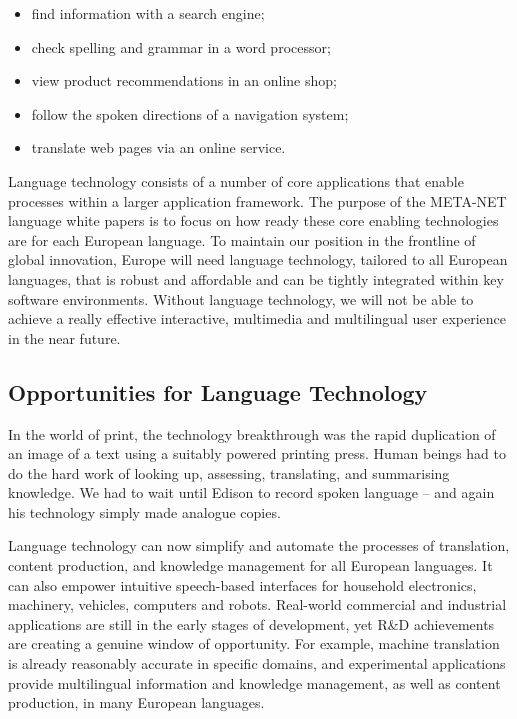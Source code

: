 \documentclass{../../metanetpaper}
\begin{document}
\begin{multicols}{2}
\begin{itemize}
\item find information with a search engine;
\item check spelling and grammar in a word processor;
\item view product recommendations in an online shop;
\item follow the spoken directions of a navigation system;
\item translate web pages via an online service.
\end{itemize}

Language technology consists of a number of core applications that enable processes within a larger application framework. The purpose of the META-NET language white papers is to focus on how ready these core enabling technologies are for each European language.  To maintain our position in the frontline of global innovation, Europe will need language technology, tailored to all European languages, that is robust and affordable and can be tightly integrated within key software environments. Without language technology, we will not be able to achieve a really effective interactive, multimedia and multilingual user experience in the near future.

\subsection{Opportunities for Language Technology}

In the world of print, the technology breakthrough was the rapid duplication of an image of a text using a suitably powered printing press. Human beings had to do the hard work of looking up, assessing, translating, and summarising knowledge. We had to wait until Edison to record spoken language -- and again his technology simply made analogue copies.

Language technology can now simplify and automate the processes of translation, content production, and knowledge management for all European languages. It can also empower intuitive speech-based interfaces for household electronics, machinery, vehicles, computers and robots. Real-world commercial and industrial applications are still in the early stages of development, yet R\&D achievements are creating a genuine window of opportunity. For example, machine translation is already reasonably accurate in specific domains, and experimental applications provide multilingual information and knowledge management, as well as content production, in many European languages. 


\end{multicols}
\end{document}
